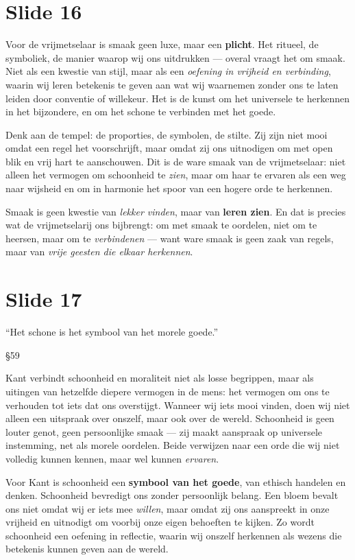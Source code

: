 \documentclass{article}
\begin{document}
\section*{Slide 16}

Voor de vrijmetselaar is smaak geen luxe, maar een \textbf{plicht}. Het ritueel, de symboliek, de manier waarop wij ons uitdrukken — overal vraagt het om smaak. Niet als een kwestie van stijl, maar als een \textit{oefening in vrijheid en verbinding}, waarin wij leren betekenis te geven aan wat wij waarnemen zonder ons te laten leiden door conventie of willekeur. Het is de kunst om het universele te herkennen in het bijzondere, en om het schone te verbinden met het goede.

Denk aan de tempel: de proporties, de symbolen, de stilte. Zij zijn niet mooi omdat een regel het voorschrijft, maar omdat zij ons uitnodigen om met open blik en vrij hart te aanschouwen. Dit is de ware smaak van de vrijmetselaar: niet alleen het vermogen om schoonheid te \textit{zien}, maar om haar te ervaren als een weg naar wijsheid en om in harmonie het spoor van een hogere orde te herkennen.

Smaak is geen kwestie van \textit{lekker vinden}, maar van \textbf{leren zien}. En dat is precies wat de vrijmetselarij ons bijbrengt: om met smaak te oordelen, niet om te heersen, maar om te \textit{verbindenen} — want ware smaak is geen zaak van regels, maar van \textit{vrije geesten die elkaar herkennen}.

\section*{Slide 17}

\epigraph{``Het schone is het symbool van het morele goede.''}{§59}

Kant verbindt schoonheid en moraliteit niet als losse begrippen, maar als uitingen van hetzelfde diepere vermogen in de mens: het vermogen om ons te verhouden tot iets dat ons overstijgt. Wanneer wij iets mooi vinden, doen wij niet alleen een uitspraak over onszelf, maar ook over de wereld. Schoonheid is geen louter genot, geen persoonlijke smaak — zij maakt aanspraak op universele instemming, net als morele oordelen. Beide verwijzen naar een orde die wij niet volledig kunnen kennen, maar wel kunnen \textit{ervaren}.

Voor Kant is schoonheid een \textbf{symbool van het goede}, van ethisch handelen en denken. Schoonheid bevredigt ons zonder persoonlijk belang. Een bloem bevalt ons niet omdat wij er iets mee \textit{willen}, maar omdat zij ons aanspreekt in onze vrijheid en uitnodigt om voorbij onze eigen behoeften te kijken. Zo wordt schoonheid een oefening in reflectie, waarin wij onszelf herkennen als wezens die betekenis kunnen geven aan de wereld.
\end{document}
